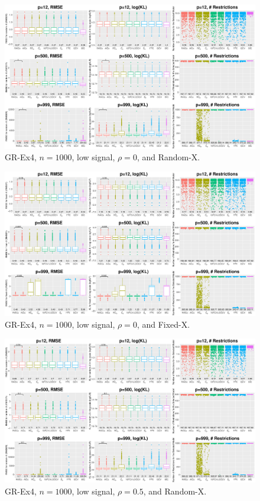 \clearpage
\begin{figure}[!ht]
\centering
\includegraphics[width=\textwidth]{figures/supplement/randomx_GR-Ex4_n1000_lsnr_rho0.eps}
\caption{GR-Ex4, $n=1000$, low signal, $\rho=0$, and Random-X.}
\end{figure}
\begin{figure}[!ht]
\centering
\includegraphics[width=\textwidth]{figures/supplement/fixedx_GR-Ex4_n1000_lsnr_rho0.eps}
\caption{GR-Ex4, $n=1000$, low signal, $\rho=0$, and Fixed-X.}
\end{figure}
\clearpage
\begin{figure}[!ht]
\centering
\includegraphics[width=\textwidth]{figures/supplement/randomx_GR-Ex4_n1000_lsnr_rho05.eps}
\caption{GR-Ex4, $n=1000$, low signal, $\rho=0.5$, and Random-X.}
\end{figure}
